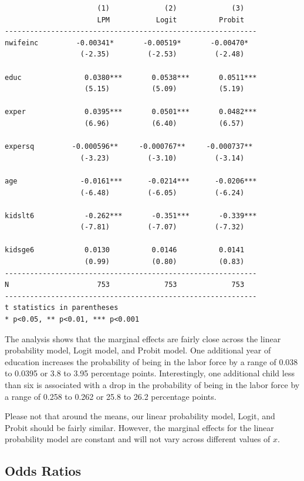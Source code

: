 \documentclass[
]{book}
\begin{document}
\begin{verbatim}
                      (1)             (2)             (3)   
                      LPM           Logit          Probit   
------------------------------------------------------------
nwifeinc         -0.00341*       -0.00519*       -0.00470*  
                  (-2.35)         (-2.53)         (-2.48)   

educ               0.0380***       0.0538***       0.0511***
                   (5.15)          (5.09)          (5.19)   

exper              0.0395***       0.0501***       0.0482***
                   (6.96)          (6.40)          (6.57)   

expersq         -0.000596**     -0.000767**     -0.000737** 
                  (-3.23)         (-3.10)         (-3.14)   

age               -0.0161***      -0.0214***      -0.0206***
                  (-6.48)         (-6.05)         (-6.24)   

kidslt6            -0.262***       -0.351***       -0.339***
                  (-7.81)         (-7.07)         (-7.32)   

kidsge6            0.0130          0.0146          0.0141   
                   (0.99)          (0.80)          (0.83)   
------------------------------------------------------------
N                     753             753             753   
------------------------------------------------------------
t statistics in parentheses
* p<0.05, ** p<0.01, *** p<0.001
\end{verbatim}

The analysis shows that the marginal effects are fairly close across the linear probability model, Logit model, and Probit model. One additional year of education increases the probability of being in the labor force by a range of 0.038 to 0.0395 or 3.8 to 3.95 percentage points. Interestingly, one additional child less than six is associated with a drop in the probability of being in the labor force by a range of 0.258 to 0.262 or 25.8 to 26.2 percentage points.

Please not that around the means, our linear probability model, Logit, and Probit should be fairly similar. However, the marginal effects for the linear probability model are constant and will not vary across different values of \(x\).

\subsection*{Odds Ratios}\label{odds-ratios}
\end{document}
